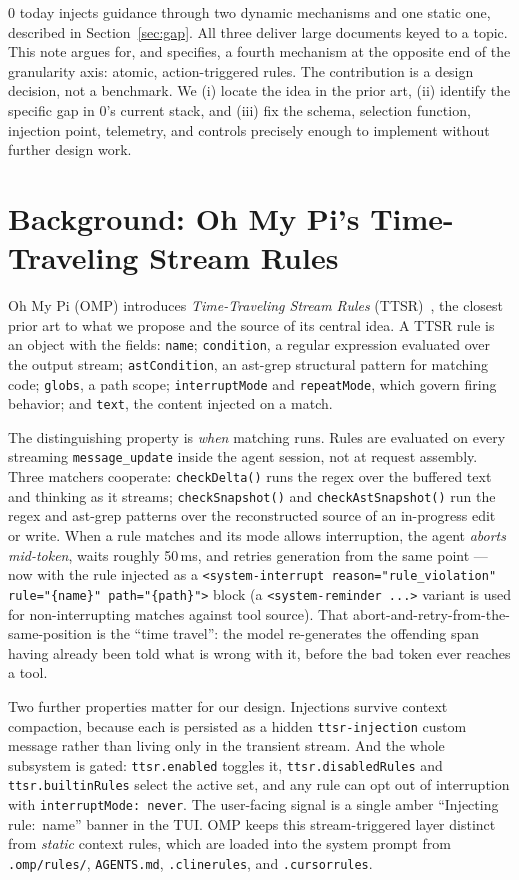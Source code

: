 \documentclass[11pt]{article}
\begin{document}
0 today injects guidance through two dynamic mechanisms and one static one,
described in Section~\ref{sec:gap}. All three deliver large documents keyed to a
topic. This note argues for, and specifies, a fourth mechanism at the opposite
end of the granularity axis: atomic, action-triggered rules. The contribution
is a design decision, not a benchmark. We (i) locate the idea in the prior art,
(ii) identify the specific gap in 0's current stack, and (iii) fix the schema,
selection function, injection point, telemetry, and controls precisely enough to
implement without further design work.

\section{Background: Oh My Pi's Time-Traveling Stream Rules}
\label{sec:ttsr}

Oh My Pi (OMP) introduces \emph{Time-Traveling Stream Rules}
(TTSR)~\cite{omp,ompttsr,ompwiki}, the closest prior art to what we propose and
the source of its central idea. A TTSR rule is an object with the fields:
\texttt{name}; \texttt{condition}, a regular expression evaluated over the output
stream; \texttt{astCondition}, an ast-grep structural pattern for matching code;
\texttt{globs}, a path scope; \texttt{interruptMode} and \texttt{repeatMode},
which govern firing behavior; and \texttt{text}, the content injected on a match.

The distinguishing property is \emph{when} matching runs. Rules are evaluated on
every streaming \texttt{message\_update} inside the agent session, not at request
assembly. Three matchers cooperate: \texttt{checkDelta()} runs the regex over the
buffered text and thinking as it streams; \texttt{checkSnapshot()} and
\texttt{checkAstSnapshot()} run the regex and ast-grep patterns over the
reconstructed source of an in-progress edit or write. When a rule matches and its
mode allows interruption, the agent \emph{aborts mid-token}, waits roughly
50\,ms, and retries generation from the same point --- now with the rule injected
as a
\texttt{<system-interrupt reason="rule\_violation" rule="\{name\}" path="\{path\}">}
block (a \texttt{<system-reminder ...>} variant is used for non-interrupting
matches against tool source). That abort-and-retry-from-the-same-position is the
``time travel'': the model re-generates the offending span having already been
told what is wrong with it, before the bad token ever reaches a tool.

Two further properties matter for our design. Injections survive context
compaction, because each is persisted as a hidden \texttt{ttsr-injection} custom
message rather than living only in the transient stream. And the whole subsystem
is gated: \texttt{ttsr.enabled} toggles it, \texttt{ttsr.disabledRules} and
\texttt{ttsr.builtinRules} select the active set, and any rule can opt out of
interruption with \texttt{interruptMode: never}. The user-facing signal is a
single amber ``Injecting rule: \guillemotright{}\,name'' banner in the TUI. OMP
keeps this stream-triggered layer distinct from \emph{static} context rules,
which are loaded into the system prompt from \texttt{.omp/rules/},
\texttt{AGENTS.md}, \texttt{.clinerules}, and \texttt{.cursorrules}.
\end{document}
